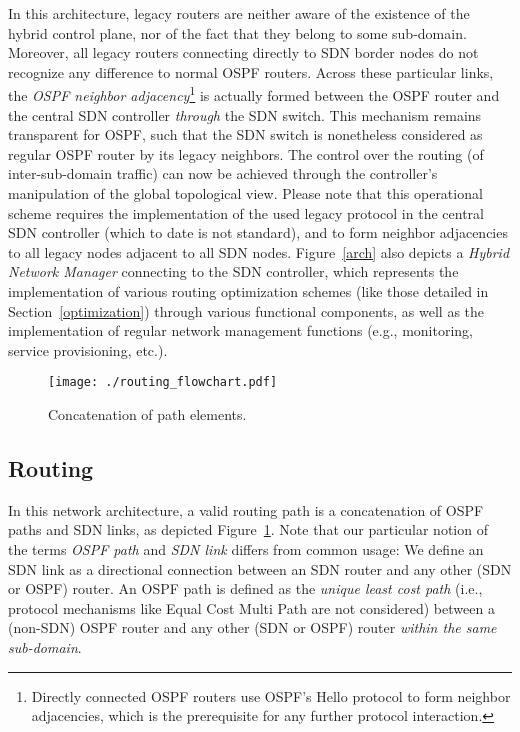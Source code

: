 \documentclass[journal]{IEEEtran}
\begin{document}
\par In this architecture, legacy routers are neither aware of the existence of the hybrid control plane, nor of the fact that they belong to some sub-domain. Moreover, all legacy routers connecting directly to SDN border nodes do not recognize any difference to normal OSPF routers. Across these particular links, the \emph{OSPF neighbor adjacency}\footnote{Directly connected OSPF routers use OSPF's Hello protocol to form neighbor adjacencies, which is the prerequisite for any further protocol interaction.} is actually formed between the OSPF router and the central SDN controller \emph{through} the SDN switch. This mechanism remains transparent for OSPF, such that the SDN switch is nonetheless considered as regular OSPF router by its legacy neighbors. The control over the routing (of inter-sub-domain traffic) can now be achieved through the controller's manipulation of the global topological view. Please note that this operational scheme requires the implementation of the used legacy protocol in the central SDN controller (which to date is not standard), and to form neighbor adjacencies to all legacy nodes adjacent to all SDN nodes. Figure~\ref{arch} also depicts a \emph{Hybrid Network Manager} connecting to the SDN controller, which represents the implementation of various routing optimization schemes (like those detailed in Section~\ref{optimization}) through various functional components, as well as the implementation of regular network management functions (e.g., monitoring, service provisioning, etc.).


\begin{figure}[h] \center
\texttt{[image: ./routing\_flowchart.pdf]}
\caption{Concatenation of path elements.}
\label{flowchart} \end{figure}

\subsection{Routing}\label{routing}

\par In this network architecture, a valid routing path is a concatenation of OSPF paths and SDN links, as depicted Figure~\ref{flowchart}. Note that our particular notion of the terms \emph{OSPF path} and \emph{SDN link} differs from common usage: We define an SDN link as a directional connection between an SDN router and any other (SDN or OSPF) router. An OSPF path is defined as the \emph{unique least cost path} (i.e., protocol mechanisms like Equal Cost Multi Path are not considered) between a (non-SDN) OSPF router and any other (SDN or OSPF) router \emph{within the same sub-domain}.
\end{document}
